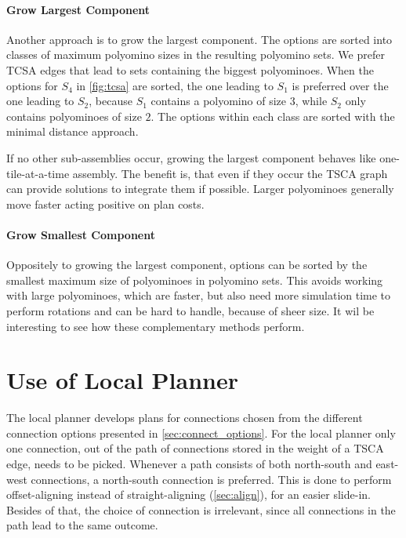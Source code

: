 \paragraph{Grow Largest Component}

Another approach is to grow the largest component.
The options are sorted into classes of maximum polyomino sizes in the resulting polyomino sets.
We prefer TCSA edges that lead to sets containing the biggest polyominoes.
When the options for $S_4$ in \autoref{fig:tcsa} are sorted, the one leading to $S_1$ is preferred over the one leading to $S_2$, because $S_1$ contains a polyomino of size $3$, while $S_2$ only contains polyominoes of size $2$. 
The options within each class are sorted with the minimal distance approach.

If no other sub-assemblies occur, growing the largest component behaves like one-tile-at-a-time assembly.
The benefit is, that even if they occur the TSCA graph can provide solutions to integrate them if possible.
Larger polyominoes generally move faster acting positive on plan costs.

\paragraph{Grow Smallest Component}

Oppositely to growing the largest component, options can be sorted by the smallest maximum size of polyominoes in polyomino sets.
This avoids working with large polyominoes, which are faster, but also need more simulation time to perform rotations and can be hard to handle, because of sheer size.
It wil be interesting to see how these complementary methods perform.


\section{Use of Local Planner}
\label{sec:local_in_global}

The local planner develops plans for connections chosen from the different connection options presented in \autoref{sec:connect_options}.
For the local planner only one connection, out of the path of connections stored in the weight of a TSCA edge, needs to be picked.
Whenever a path consists of both north-south and east-west connections, a north-south connection is preferred.
This is done to perform offset-aligning instead of straight-aligning (\autoref{sec:align}), for an easier slide-in.
Besides of that, the choice of connection is irrelevant, since all connections in the path lead to the same outcome.

